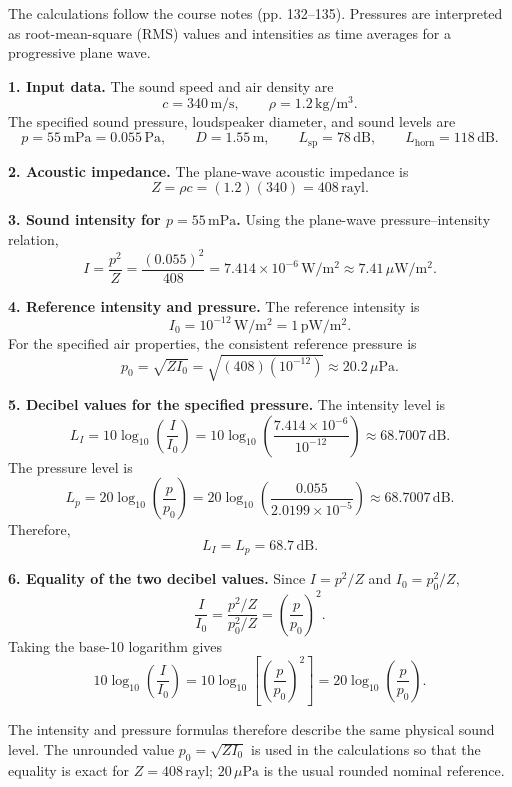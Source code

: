 \begingroup
\setlength{\abovedisplayskip}{6pt}
\setlength{\belowdisplayskip}{6pt}
\setlength{\abovedisplayshortskip}{4pt}
\setlength{\belowdisplayshortskip}{4pt}
\setlength{\intextsep}{6pt}

The calculations follow the course notes (pp. 132--135). Pressures are interpreted as root-mean-square (RMS) values and intensities as time averages for a progressive plane wave.

\textbf{1. Input data.} The sound speed and air density are
\[
\boxed{c=340\,\mathrm{m/s},\qquad \rho=1.2\,\mathrm{kg/m^3}.}
\]
The specified sound pressure, loudspeaker diameter, and sound levels are
\[
\boxed{p=55\,\mathrm{mPa}=0.055\,\mathrm{Pa},\qquad
D=1.55\,\mathrm{m},\qquad L_{\mathrm{sp}}=78\,\mathrm{dB},\qquad
L_{\mathrm{horn}}=118\,\mathrm{dB}.}
\]

\textbf{2. Acoustic impedance.} The plane-wave acoustic impedance is
\[
Z=\rho c=(1.2)(340)=\boxed{408\,\mathrm{rayl}.}
\]

\textbf{3. Sound intensity for $p=55\,\mathrm{mPa}$.} Using the plane-wave pressure--intensity relation,
\[
I=\frac{p^2}{Z}=\frac{(0.055)^2}{408}
  =7.414\times10^{-6}\,\mathrm{W/m^2}
  \approx\boxed{7.41\,\mu\mathrm{W/m^2}.}
\]

\textbf{4. Reference intensity and pressure.} The reference intensity is
\[
\boxed{I_0=10^{-12}\,\mathrm{W/m^2}=1\,\mathrm{pW/m^2}.}
\]
For the specified air properties, the consistent reference pressure is
\[
p_0=\sqrt{ZI_0}
    =\sqrt{(408)(10^{-12})}
    \approx\boxed{20.2\,\mu\mathrm{Pa}.}
\]

\textbf{5. Decibel values for the specified pressure.} The intensity level is
\[
L_I=10\log_{10}\left(\frac{I}{I_0}\right)
 =10\log_{10}\left(\frac{7.414\times10^{-6}}{10^{-12}}\right)
 \approx68.7007\,\mathrm{dB}.
\]
The pressure level is
\[
L_p=20\log_{10}\left(\frac{p}{p_0}\right)
 =20\log_{10}\left(\frac{0.055}{2.0199\times10^{-5}}\right)
 \approx68.7007\,\mathrm{dB}.
\]
Therefore,
\[
\boxed{L_I=L_p=68.7\,\mathrm{dB}.}
\]

\textbf{6. Equality of the two decibel values.} Since $I=p^2/Z$ and $I_0=p_0^2/Z$,
\[
\frac{I}{I_0}=\frac{p^2/Z}{p_0^2/Z}=\left(\frac{p}{p_0}\right)^2.
\]
Taking the base-10 logarithm gives
\[
10\log_{10}\left(\frac{I}{I_0}\right)
 =10\log_{10}\left[\left(\frac{p}{p_0}\right)^2\right]
 =20\log_{10}\left(\frac{p}{p_0}\right).
\]
\begin{samepage}
The intensity and pressure formulas therefore describe the same physical sound level. The unrounded value $p_0=\sqrt{ZI_0}$ is used in the calculations so that the equality is exact for $Z=408\,\mathrm{rayl}$; $20\,\mu\mathrm{Pa}$ is the usual rounded nominal reference.\par
\end{samepage}

